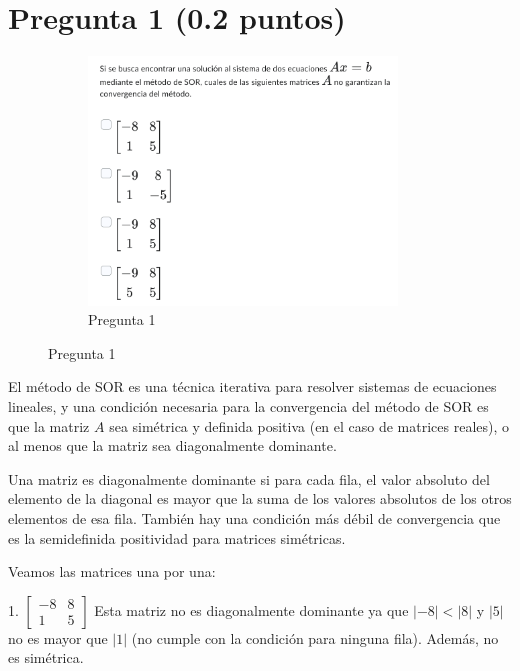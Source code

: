 \section{Pregunta 1 (0.2 puntos)}

\begin{figure}[H]
    \centering
    \begin{subfigure}[b]{0.9\textwidth}
        \centering
        \includegraphics[width=0.9\textwidth]{Figures/0. General/1.png}
        \caption{Pregunta 1}
        \label{fig: pregunta 1}
    \end{subfigure}
\end{figure}

El método de SOR es una técnica iterativa para resolver sistemas de ecuaciones lineales, y una condición necesaria para la convergencia del método de SOR es que la matriz \( A \) sea simétrica y definida positiva (en el caso de matrices reales), o al menos que la matriz sea diagonalmente dominante.

Una matriz es diagonalmente dominante si para cada fila, el valor absoluto del elemento de la diagonal es mayor que la suma de los valores absolutos de los otros elementos de esa fila. También hay una condición más débil de convergencia que es la semidefinida positividad para matrices simétricas.

Veamos las matrices una por una:

1. \(\begin{bmatrix}-8 & 8\\ 1 & 5\end{bmatrix}\)
Esta matriz no es diagonalmente dominante ya que \( |-8| < |8| \) y \( |5| \) no es mayor que \( |1| \) (no cumple con la condición para ninguna fila). Además, no es simétrica.

